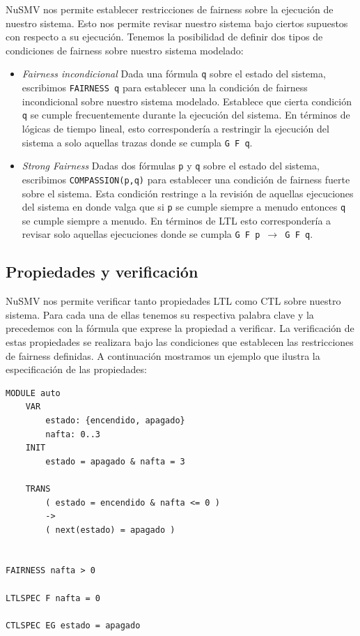 \documentclass[titlepage, 12pt]{book}
\begin{document}
NuSMV nos permite establecer restricciones de fairness sobre la ejecuci\'on de nuestro sistema. Esto nos permite revisar nuestro sistema bajo ciertos supuestos con respecto a su ejecuci\'on. Tenemos la posibilidad de definir dos tipos de condiciones de fairness sobre nuestro sistema modelado:
\begin{itemize}

\item \textit{Fairness incondicional} Dada una f\'ormula \texttt{q} sobre el estado del sistema, escribimos \texttt{FAIRNESS q} para establecer una la condici\'on de fairness incondicional sobre nuestro sistema modelado. Establece que cierta condici\'on \texttt{q} se cumple frecuentemente durante la ejecuci\'on del sistema. En t\'erminos de l\'ogicas de tiempo lineal, esto corresponder\'ia a restringir la ejecuci\'on del sistema a solo aquellas trazas donde se cumpla \texttt{G F q}.

\item \textit{Strong Fairness} Dadas dos f\'ormulas \texttt{p} y \texttt{q} sobre el estado del sistema, escribimos \texttt{COMPASSION(p,q)} para establecer una condici\'on de fairness fuerte sobre el sistema. Esta condici\'on restringe a la revisi\'on de aquellas ejecuciones del sistema en donde valga que si \texttt{p} se cumple siempre a menudo entonces \texttt{q} se cumple siempre a menudo. En t\'erminos de LTL esto corresponder\'ia a revisar solo aquellas ejecuciones donde se cumpla \texttt{G F p $\rightarrow$ G F q}.

\end{itemize}

\subsection*{Propiedades y verificaci\'on}

NuSMV nos permite verificar tanto propiedades LTL como CTL sobre nuestro sistema. Para cada una de ellas tenemos su respectiva palabra clave y la precedemos con la f\'ormula que exprese la propiedad a verificar. La verificaci\'on de estas propiedades se realizara bajo las condiciones que establecen las restricciones de fairness definidas. A continuaci\'on mostramos un ejemplo que ilustra la especificaci\'on de las propiedades:

\begin{verbatim}
MODULE auto
    VAR
        estado: {encendido, apagado}
        nafta: 0..3
    INIT
        estado = apagado & nafta = 3

    TRANS
        ( estado = encendido & nafta <= 0 ) 
        -> 
        ( next(estado) = apagado )


FAIRNESS nafta > 0

LTLSPEC F nafta = 0

CTLSPEC EG estado = apagado

\end{verbatim}
\end{document}
